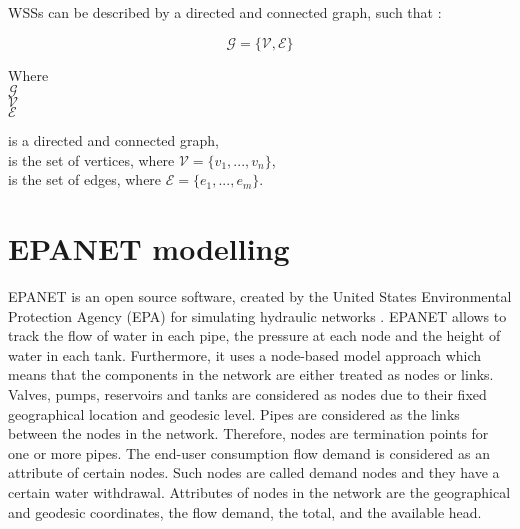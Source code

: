 WSSs can be described by a directed and connected graph, such that \cite{graph_intro}: 

\begin{equation}
  \label{Numberofchords}
  \mathcal{G} = \{\mathcal{V}, \mathcal{E} \} 
\end{equation}

\begin{minipage}[t]{0.20\textwidth}
Where\\
\hspace*{8mm} $\mathcal{G} $ \\
\hspace*{8mm} $\mathcal{V} $ \\
\hspace*{8mm} $\mathcal{E} $
\end{minipage}
\begin{minipage}[t]{0.68\textwidth}
\vspace*{2mm}
\hspace*{8mm} is a directed and connected graph,\\
\hspace*{8mm} is the set of vertices, where $\mathcal{V} = \{v_1, ..., v_n\}$,\\
\hspace*{8mm} is the set of edges, where $\mathcal{E} = \{e_1, ..., e_m\}$. 
\end{minipage}



\section{EPANET modelling}
\label{EPANET modelling}

EPANET is an open source software, created by the United States Environmental Protection Agency (EPA) for simulating hydraulic networks \cite{agency2016epanet}. EPANET allows to track the flow of water in each pipe, the pressure at each node and the height of water in each tank. Furthermore, it uses a node-based model approach which means that the components in the network are either treated as nodes or links. Valves, pumps, reservoirs and tanks are considered as nodes due to their fixed geographical location and geodesic level. Pipes are considered as the links between the nodes in the network. Therefore, nodes are termination points for one or more pipes. The end-user consumption flow demand is considered as an attribute of certain nodes. Such nodes are called demand nodes and they have a certain water withdrawal. Attributes of nodes in the network are the geographical and geodesic coordinates, the flow demand, the total, and the available head. \cite{agency2016epanet}  

